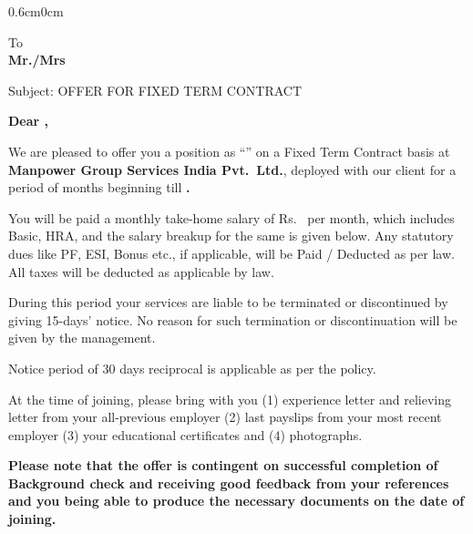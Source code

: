 \documentclass[11pt,a4paper]{article}
\begin{document}
\begin{adjustwidth}{0.6cm}{0cm}

\noindent\textbf{}

\vspace{0.3cm}

\noindent To\\
\textbf{Mr./Mrs   }\\
\textbf{}

\vspace{0.3cm}

\noindent Subject: OFFER FOR FIXED TERM CONTRACT

\vspace{0.3cm}

\noindent\textbf{Dear   ,}

\RaggedRight

%
We are pleased to offer you a position as ``\textbf{}'' on a Fixed Term Contract basis at \textbf{Manpower
Group Services India Pvt.\ Ltd.}, deployed with our client \textbf{\textcolor{accent}{}} for a period of
\textbf{} months beginning \textbf{} till
\textbf{.}

You will be paid a monthly take-home salary of Rs.\ \textbf{} per month, which includes
Basic, HRA, and the salary breakup for the same is given below. Any statutory dues like PF, ESI, Bonus etc., if
applicable, will be Paid / Deducted as per law. All taxes will be deducted as applicable by law.

During this period your services are liable to be terminated or discontinued by giving 15-days' notice. No
reason for such termination or discontinuation will be given by the management.

Notice period of 30 days reciprocal is applicable as per the policy.

At the time of joining, please bring with you (1) experience letter and relieving letter from your all-previous
employer (2) last payslips from your most recent employer (3) your educational certificates and (4)
photographs.

\vspace{2pt}
\noindent\colorbox{hlyellow}{\parbox{\dimexpr\linewidth-2\fboxsep\relax}{\RaggedRight\textbf{Please note that the offer is contingent on successful completion of Background check and receiving good feedback from your references and you being able to produce the necessary documents on the date of joining.}}}
\vspace{2pt}


\end{adjustwidth}
\end{document}
